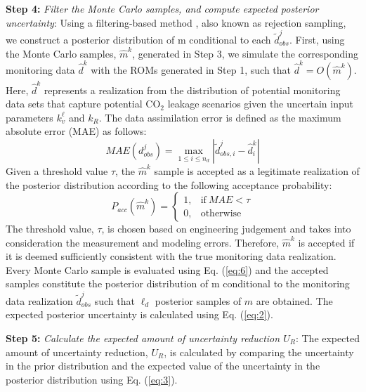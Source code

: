 \documentclass[10pt, twoside]{article}
\begin{document}
\textbf{Step 4:} \textit{Filter the Monte Carlo samples, and compute expected posterior uncertainty}: Using a filtering-based method \citep{Caers2011}, also known as rejection sampling, we construct a posterior distribution of m conditional to each $\widetilde{d}_{obs}^j$. First, using the Monte Carlo samples, $\hat{m}^k$, generated in Step 3, we simulate the corresponding monitoring data $\hat{d}^k$ with the ROMs generated in Step 1, such that $\hat{d}^k=O(\hat{m}^k)$. Here, $\hat{d}^k$ represents a realization from the distribution of potential monitoring data sets that capture potential CO$_2$ leakage scenarios given the uncertain input parameters $k_v^\ell$ and $k_R$. The data assimilation error is defined as the maximum absolute error (MAE) as follows:
\begin{equation} \label{eq:5}
    MAE(d^j_{obs}) = \max\limits_{1\leq i \leq n_d} | \widetilde{d}^j_{obs,i} - \hat{d}^k_i | 
\end{equation}
Given a threshold value $\tau$, the $\hat{m}^k$ sample is accepted as a legitimate realization of the posterior distribution according to the following acceptance probability:
\begin{equation} \label{eq:6}
    P_{acc}(\hat{m}^k) = 
    \begin{cases}
      1, & \text{if}\ MAE<\tau \\
      0, & \text{otherwise}
    \end{cases}
\end{equation}
The threshold value, $\tau$, is chosen based on engineering judgement and takes into consideration the measurement and modeling errors. Therefore, $\hat{m}^k$ is accepted if it is deemed sufficiently consistent with the true monitoring data realization. Every Monte Carlo sample is evaluated using Eq. (\ref{eq:6}) and the accepted samples constitute the posterior distribution of m conditional to the monitoring data realization $\widetilde{d}^j_{obs}$ such that $\ell_d$ posterior samples of $m$ are obtained. The expected posterior uncertainty is calculated using Eq. (\ref{eq:2}). 

\textbf{Step 5:} \textit{Calculate the expected amount of uncertainty reduction $U_R$}: The expected amount of uncertainty reduction, $U_R$, is calculated by comparing the uncertainty in the prior distribution and the expected value of the uncertainty in the posterior distribution using Eq. (\ref{eq:3}). 
\end{document}
